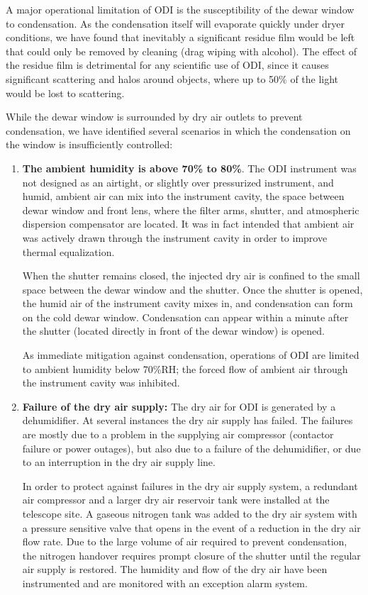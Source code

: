 \documentclass[]{spieman}
\begin{document}
A major operational limitation of ODI is the susceptibility of the dewar window
to condensation. As the condensation itself will evaporate quickly under dryer
conditions, we have found that inevitably a significant residue film would be
left that could only be removed by  cleaning (drag wiping with alcohol). The
effect of the residue film is detrimental for any scientific use of ODI, since
it causes significant scattering and halos around objects, where up to 50\%  of
the light would be lost to scattering.

While the dewar window is surrounded by dry air outlets to prevent condensation,
we have identified several scenarios in which the condensation  on the window is
insufficiently controlled:

\begin{enumerate}

\item {\bf The ambient humidity is above 70\% to 80\%}. The ODI instrument was
not designed as an airtight, or slightly over pressurized instrument, and humid,
ambient air can mix into the instrument cavity, the space between dewar window
and front lens, where the filter arms, shutter, and atmospheric dispersion
compensator are located. It was in fact intended that ambient air was actively
drawn through	the instrument cavity in order to improve thermal equalization.

When the shutter remains closed, the
injected dry air is confined to the small space between the dewar window and
the shutter. Once the shutter is opened, the  humid air of the instrument cavity
mixes in, and condensation can form on the cold dewar window. Condensation can
appear within a minute after the shutter (located directly in front of the 
dewar window) is opened.

As immediate mitigation against condensation, operations of ODI are limited to
ambient humidity below 70\%RH; the forced flow of ambient air through the
instrument cavity was inhibited.

\item {\bf Failure of the dry air supply:} The dry air for ODI is generated by a
dehumidifier. At several instances the dry air supply has failed. The failures are 
mostly due to a problem in the supplying air compressor (contactor failure or power outages),
but also due to a failure of the dehumidifier, or due to an interruption in the
dry air supply line. 

In order to protect against failures in the dry air supply system,
a redundant air compressor and a larger dry air reservoir tank were installed at
the telescope site. A gaseous nitrogen tank was added to the dry air system with
a pressure sensitive valve that opens in the event of a reduction in the dry air
flow rate. Due to the large volume of air required to prevent condensation, the
nitrogen handover requires prompt closure of the shutter until the regular air
supply is restored. The humidity and flow of the dry air have been instrumented
and are monitored with an exception alarm system.


\end{enumerate}
\end{document}
